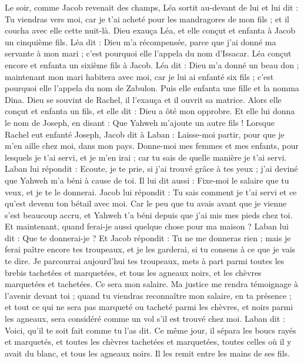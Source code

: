\begin{multicols}{2}
Le soir, comme Jacob revenait des champs, Léa sortit au-devant de lui et lui dit : Tu viendras vers moi, car je t'ai acheté pour les mandragores de mon fils ; et il coucha avec elle cette nuit-là.
Dieu exauça Léa, et elle conçut et enfanta à Jacob un cinquième fils.
Léa dit : Dieu m'a récompensée, parce que j'ai donné ma servante à mon mari ; c'est pourquoi elle l’appela du nom d’Issacar.
Léa conçut encore et enfanta un sixième fils à Jacob.
Léa dit : Dieu m'a donné un beau don ; maintenant mon mari habitera avec moi, car je lui ai enfanté six fils ; c'est pourquoi elle l’appela du nom de Zabulon.
Puis elle enfanta une fille et la nomma Dina.
Dieu se souvint de Rachel, il l’exauça et il ouvrit sa matrice.
Alors elle conçut et enfanta un fils, et elle dit : Dieu a ôté mon opprobre.
Et elle lui donna le nom de Joseph, en disant : Que Yahweh m'ajoute un autre fils !
Lorsque Rachel eut enfanté Joseph, Jacob dit à Laban : Laisse-moi partir, pour que je m’en aille chez moi, dans mon pays.
Donne-moi mes femmes et mes enfants, pour lesquels je t'ai servi, et je m'en irai ; car tu sais de quelle manière je t'ai servi.
Laban lui répondit : Ecoute, je te prie, si j'ai trouvé grâce à tes yeux ; j’ai deviné que Yahweh m'a béni à cause de toi.
Il lui dit aussi : Fixe-moi le salaire que tu veux, et je te le donnerai.
Jacob lui répondit : Tu sais comment je t'ai servi et ce qu'est devenu ton bétail avec moi.
Car le peu que tu avais avant que je vienne s’est beaucoup accru, et Yahweh t'a béni depuis que j’ai mis mes pieds chez toi. Et maintenant, quand ferai-je aussi quelque chose pour ma maison ?
Laban lui dit : Que te donnerai-je ? Et Jacob répondit : Tu ne me donneras rien ; mais je ferai paître encore tes troupeaux, et je les garderai, si tu consens à ce que je vais te dire.
Je parcourrai aujourd'hui tes troupeaux, mets à part parmi toutes les brebis tachetées et marquetées, et tous les agneaux noirs, et les chèvres marquetées et tachetées. Ce sera mon salaire.
Ma justice me rendra témoignage à l’avenir devant toi ; quand tu viendras reconnaître mon salaire, en ta présence ; et tout ce qui ne sera pas marqueté ou tacheté parmi les chèvres, et noirs parmi les agneaux, sera considéré comme un vol s'il est trouvé chez moi.
Laban dit : Voici, qu'il te soit fait comme tu l'as dit.
Ce même jour, il sépara les boucs rayés et marquetés, et toutes les chèvres tachetées et marquetées, toutes celles où il y avait du blanc, et tous les agneaux noirs. Il les remit entre les mains de ses fils.

\end{multicols}
